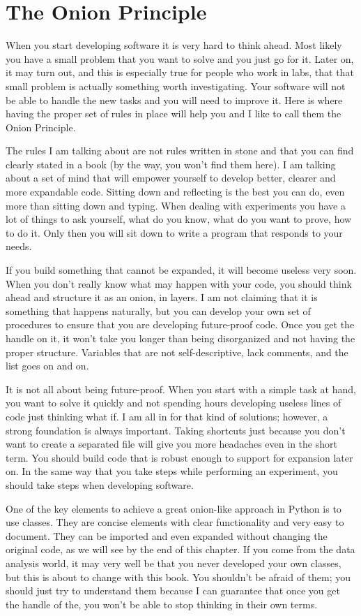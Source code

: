 \section{The Onion Principle}
When you start developing software it is very hard to think ahead. Most likely you have a small problem that you want to solve and you just go for it. Later on, it may turn out, and this is especially true for people who work in labs, that that small problem is actually something worth investigating. Your software will not be able to handle the new tasks and you will need to improve it. Here is where having the proper set of rules in place will help you and I like to call them the Onion Principle.

The rules I am talking about are not rules written in stone and that you can find clearly stated in a book (by the way, you won’t find them here). I am talking about a set of mind that will empower yourself to develop better, clearer and more expandable code. Sitting down and reflecting is the best you can do, even more than sitting down and typing. When dealing with experiments you have a lot of things to ask yourself, what do you know, what do you want to prove, how to do it. Only then you will sit down to write a program that responds to your needs.

If you build something that cannot be expanded, it will become useless very soon. When you don’t really know what may happen with your code, you should think ahead and structure it as an onion, in layers. I am not claiming that it is something that happens naturally, but you can develop your own set of procedures to ensure that you are developing future-proof code. Once you get the handle on it, it won’t take you longer than being disorganized and not having the proper structure. Variables that are not self-descriptive, lack comments, and the list goes on and on.

It is not all about being future-proof. When you start with a simple task at hand, you want to solve it quickly and not spending hours developing useless lines of code just thinking what if. I am all in for that kind of solutions; however, a strong foundation is always important. Taking shortcuts just because you don’t want to create a separated file will give you more headaches even in the short term. You should build code that is robust enough to support for expansion later on. In the same way that you take steps while performing an experiment, you should take steps when developing software.

One of the key elements to achieve a great onion-like approach in Python is to use classes. They are concise elements with clear functionality and very easy to document. They can be imported and even expanded without changing the original code, as we will see by the end of this chapter. If you come from the data analysis world, it may very well be that you never developed your own classes, but this is about to change with this book. You shouldn’t be afraid of them; you should just try to understand them because I can guarantee that once you get the handle of the, you won’t be able to stop thinking in their own terms.

